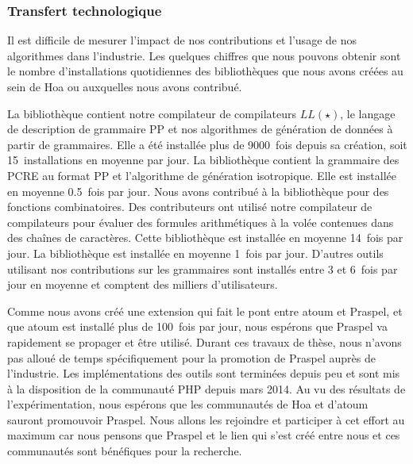 \subsubsection{Transfert technologique}

Il est difficile de mesurer l'impact de nos contributions et l'usage de nos
algorithmes dans l'industrie. Les quelques chiffres que nous pouvons obtenir
sont le nombre d'installations quotidiennes des bibliothèques que nous avons
créées au sein de Hoa ou auxquelles nous avons contribué.

La bibliothèque  contient notre compilateur de
compilateurs $LL(\star)$, le langage de description de grammaire PP et nos
algorithmes de génération de données à partir de grammaires. Elle a été
installée plus de 9000~fois depuis sa création, soit 15~installations en moyenne
par jour. La bibliothèque  contient la grammaire des
PCRE au format PP et l'algorithme de génération isotropique. Elle est installée
en moyenne 0.5~fois par jour. Nous avons contribué à la bibliothèque
 pour des fonctions combinatoires. Des contributeurs ont
utilisé notre compilateur de compilateurs pour évaluer des formules
arithmétiques à la volée contenues dans des chaînes de caractères. Cette
bibliothèque est installée en moyenne 14~fois par jour. La bibliothèque
 est installée en moyenne 1~fois par jour.  D'autres
outils utilisant nos contributions sur les grammaires sont installés entre 3 et
6~fois par jour en moyenne et comptent des milliers d'utilisateurs. 

Comme nous avons créé une extension qui fait le pont entre atoum et Praspel, et
que atoum est installé plus de 100~fois par jour, nous espérons que Praspel va
rapidement se propager et être utilisé. Durant ces travaux de thèse, nous
n'avons pas alloué de temps spécifiquement pour la promotion de Praspel auprès
de l'industrie. Les implémentations des outils sont terminées depuis peu et sont
mis à la disposition de la communauté PHP depuis mars 2014. Au vu des résultats
de l'expérimentation, nous espérons que les communautés de Hoa et d'atoum
sauront promouvoir Praspel. Nous allons les rejoindre et participer à cet effort
au maximum car nous pensons que Praspel et le lien qui s'est créé entre nous et
ces communautés sont bénéfiques pour la recherche.
